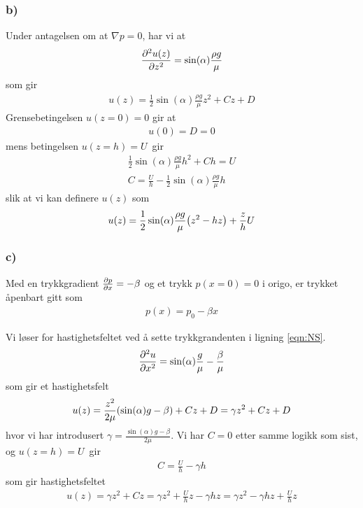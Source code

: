 \documentclass[12p,a4paper]{article}
\newcommand{\half}{\frac{1}{2}}
\begin{document}
\subsubsection*{b)}
Under antagelsen om at $\nabla p = 0$, har vi at
\begin{align*}
    \pdv[2]{u(z)}{z} = \sin(\alpha) \frac{\rho g}{\mu}
\end{align*}
som gir
\begin{align*}
    u(z) = \half \sin(\alpha) \frac{\rho g}{\mu}z^2 + Cz + D
\end{align*}
Grensebetingelsen $u(z=0) = 0$ gir at
\begin{align*}
    u(0) = D = 0
\end{align*}
mens betingelsen $u(z=h) = U$ gir
\begin{align*}
    \half \sin(\alpha) \frac{\rho g}{\mu}h^2 + Ch = U \\
    C = \frac{U}{h} - \half \sin(\alpha) \frac{\rho g}{\mu}h
\end{align*}
slik at vi kan definere $u(z)$ som
\begin{align*}
    u(z) = \half \sin(\alpha) \frac{\rho g}{\mu}\qty(z^2 - hz) + \frac{z}{h}U
\end{align*}


\subsubsection*{c)}
Med en trykkgradient $\pdv{p}{x} = -\beta$ og et trykk $p(x=0) = 0$ i origo, er trykket åpenbart gitt som
\begin{align*}
    p(x) = p_0 - \beta x
\end{align*}

Vi løser for hastighetsfeltet ved å sette trykkgrandenten i ligning \ref{eqn:NS}.
\begin{align*}
    \pdv[2]{u}{x} = \sin(\alpha)\frac{g}{\mu} -\frac{\beta}{\mu}
\end{align*}
som gir et hastighetsfelt
\begin{align*}
    u(z) = \frac{z^2}{2\mu}\qty(\sin(\alpha)g -\beta) + Cz + D = \gamma z^2 + Cz + D
\end{align*}
hvor vi har introdusert $\gamma = \frac{\sin(\alpha)g-\beta}{2\mu}$. Vi har $C=0$ etter samme logikk som sist, og $u(z=h) = U$ gir
\begin{align*}
    C = \frac{U}{h} - \gamma h
\end{align*}
som gir hastighetsfeltet
\begin{align*}
    u(z) = \gamma z^2 + Cz = \gamma z^2 + \frac{U}{h}z - \gamma h z = \gamma z^2 - \gamma hz + \frac{U}{h}z
\end{align*}
\end{document}
